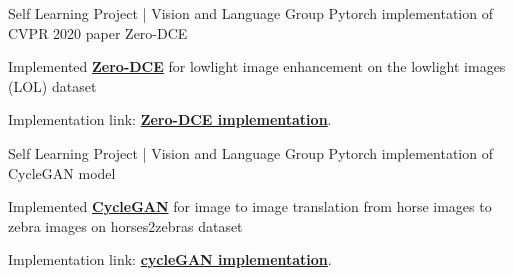 \begin{cventries}
\cventry
    {Self Learning Project | Vision and Language Group} %
    {Pytorch implementation of CVPR 2020 paper Zero-DCE} %
    {} %
    {} %
    {
      \begin{cvitems} %
        \item {Implemented \href{https://openaccess.thecvf.com/content_CVPR_2020/papers/Guo_Zero-Reference_Deep_Curve_Estimation_for_Low-Light_Image_Enhancement_CVPR_2020_paper.pdf}{\bf Zero-DCE} for lowlight image enhancement on the lowlight images (LOL) dataset}
        \item {Implementation link: {\href{https://github.com/kumar-devesh/Zero-DCE}{\bf Zero-DCE implementation}}.}
      \end{cvitems}
    }
    
\cventry
    {Self Learning Project | Vision and Language Group} %
    {Pytorch implementation of CycleGAN model} %
    {} %
    {} %
    {
      \begin{cvitems} %
        \item {Implemented \href{https://arxiv.org/abs/1703.10593}{\bf CycleGAN} for image to image translation from horse images to zebra images on horses2zebras dataset}
        \item {Implementation link: {\href{https://github.com/kumar-devesh/cycleGAN}{\bf cycleGAN implementation}}.}
      \end{cvitems}
    }



\end{cventries}